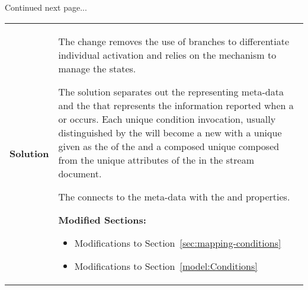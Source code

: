 Continued next page...

\begin{table}[ht]
  \centering 
  \tabulinesep=6pt
  \begin{tabu} to 6in {|l|X|} \everyrow{\hline}
    \hline
    \bfseries {Solution} &
    {
      The change removes the use of branches to differentiate individual  activation and relies on the   mechanism to manage the  states.
      \vspace{6pt}
      
      The solution separates out the  representing meta-data and the  that represents the information reported when a  or  occurs. Each unique condition invocation, usually distinguished by the  will become a new  with a unique  given as the  of the  and a composed unique  composed from the unique attributes of the  in the stream document.

      \vspace{6pt}
      The  connects to the  meta-data  with the  and  properties.

      
      \vspace{12pt}
      \textbf{Modified Sections:}
      \begin{itemize}
        \item Modifications to Section~\ref{sec:mapping-conditions}   
        \item Modifications to Section~\ref{model:Conditions}
      \end{itemize}
    }\\
  \end{tabu}
\end{table}


\FloatBarrier

